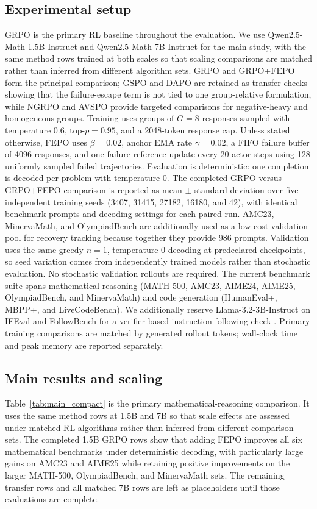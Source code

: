 \documentclass{article}
\newcommand{\FEPO}{\textsc{FEPO}\xspace}
\begin{document}
\subsection{Experimental setup}
GRPO is the primary RL baseline throughout the evaluation. We use Qwen2.5-Math-1.5B-Instruct and Qwen2.5-Math-7B-Instruct for the main study, with the same method rows trained at both scales so that scaling comparisons are matched rather than inferred from different algorithm sets. GRPO and GRPO+\FEPO form the principal comparison; GSPO and DAPO are retained as transfer checks showing that the failure-escape term is not tied to one group-relative formulation, while NGRPO and AVSPO provide targeted comparisons for negative-heavy and homogeneous groups. Training uses groups of $G=8$ responses sampled with temperature $0.6$, top-$p=0.95$, and a 2048-token response cap. Unless stated otherwise, \FEPO uses $\beta=0.02$, anchor EMA rate $\gamma=0.02$, a FIFO failure buffer of 4096 responses, and one failure-reference update every 20 actor steps using 128 uniformly sampled failed trajectories. Evaluation is deterministic: one completion is decoded per problem with temperature $0$. The completed GRPO versus GRPO+\FEPO comparison is reported as mean $\pm$ standard deviation over five independent training seeds (3407, 31415, 27182, 16180, and 42), with identical benchmark prompts and decoding settings for each paired run. AMC23, MinervaMath, and OlympiadBench are additionally used as a low-cost validation pool for recovery tracking because together they provide 986 prompts. Validation uses the same greedy $n=1$, temperature-$0$ decoding at predeclared checkpoints, so seed variation comes from independently trained models rather than stochastic evaluation. No stochastic validation rollouts are required. The current benchmark suite spans mathematical reasoning (MATH-500, AMC23, AIME24, AIME25, OlympiadBench, and MinervaMath) and code generation (HumanEval+, MBPP+, and LiveCodeBench). We additionally reserve Llama-3.2-3B-Instruct on IFEval and FollowBench for a verifier-based instruction-following check \citep{zhou2023ifeval,jiang2024followbench}. Primary training comparisons are matched by generated rollout tokens; wall-clock time and peak memory are reported separately.

\subsection{Main results and scaling}
Table~\ref{tab:main_compact} is the primary mathematical-reasoning comparison. It uses the same method rows at 1.5B and 7B so that scale effects are assessed under matched RL algorithms rather than inferred from different comparison sets. The completed 1.5B GRPO rows show that adding \FEPO improves all six mathematical benchmarks under deterministic decoding, with particularly large gains on AMC23 and AIME25 while retaining positive improvements on the larger MATH-500, OlympiadBench, and MinervaMath sets. The remaining transfer rows and all matched 7B rows are left as placeholders until those evaluations are complete.
\end{document}

